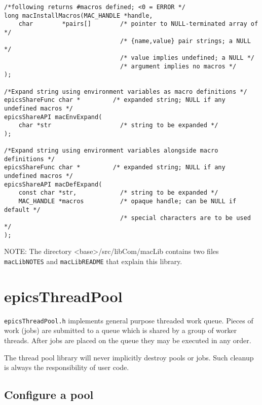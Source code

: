 \begin{verbatim}
/*following returns #macros defined; <0 = ERROR */
long macInstallMacros(MAC_HANDLE *handle,
    char        *pairs[]        /* pointer to NULL-terminated array of */
                                /* {name,value} pair strings; a NULL */
                                /* value implies undefined; a NULL */
                                /* argument implies no macros */
);

/*Expand string using environment variables as macro definitions */
epicsShareFunc char *         /* expanded string; NULL if any undefined macros */
epicsShareAPI macEnvExpand(
    char *str                   /* string to be expanded */
);

/*Expand string using environment variables alongside macro definitions */
epicsShareFunc char *         /* expanded string; NULL if any undefined macros */
epicsShareAPI macDefExpand(
    const char *str,            /* string to be expanded */
    MAC_HANDLE *macros          /* opaque handle; can be NULL if default */
                                /* special characters are to be used */
);
\end{verbatim}

NOTE: The directory \textless{}base\textgreater{}/src/libCom/macLib contains two files \verb|macLibNOTES| and \verb|macLibREADME| that explain this library.

\section{epicsThreadPool}


\verb|epicsThreadPool.h| implements general purpose threaded work queue.
Pieces of work (jobs) are submitted to a queue which is shared by a group of worker threads.
After jobs are placed on the queue they may be executed in any order.

The thread pool library will never implicitly destroy pools or jobs.
Such cleanup is always the responsibility of user code.

\subsection{Configure a pool}

